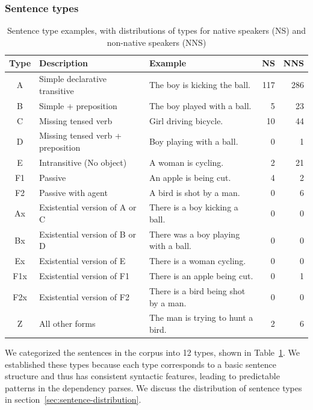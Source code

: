 \subsubsection{Sentence types}

\begin{table}[htb!]
\begin{center}
\begin{tabular}{|c|l|l|r|r|}
\hline
Type & Description & Example & NS & NNS \\
\hline
 A & Simple declarative transitive & The boy is kicking the ball. & 117 & 286 \\
 \hline
 B & Simple + preposition & The boy played with a ball. & 5 & 23 \\
 \hline
 C & Missing tensed verb & Girl driving bicycle. & 10 & 44 \\
 \hline
 D & Missing tensed verb + preposition & Boy playing with a ball. & 0 & 1 \\
 \hline
 E & Intransitive (No object) & A woman is cycling. & 2 & 21 \\
 \hline
 F1 & Passive & An apple is being cut. & 4 & 2 \\
 \hline
 F2 & Passive with agent & A bird is shot by a man. & 0 & 6 \\
 \hline
 Ax & Existential version of A or C & There is a boy kicking a ball. & 0 & 0 \\
 \hline
 Bx & Existential version of B  or D & There was a boy playing with a ball. & 0 & 0 \\
 \hline
 Ex & Existential version of E & There is a woman cycling. & 0 & 0 \\
 \hline
 F1x & Existential version of F1 & There is an apple being cut. & 0 & 1 \\
 \hline
 F2x & Existential version of F2 & There is a bird being shot by a man. & 0 & 0 \\
 \hline
 Z & All other forms & The man is trying to hunt a bird. & 2 & 6 \\
 \hline
\end{tabular}
\end{center}
\caption{Sentence type examples, with distributions of types for
  native speakers (NS) and non-native speakers (NNS)}
\label{tab:sentence-type}
\end{table}

We categorized the sentences in the corpus into 12 types, shown in
Table~\ref{tab:sentence-type}. We established these types because each
type corresponds to a basic sentence structure and thus has consistent
syntactic features, leading to predictable patterns in the dependency
parses.  We discuss the distribution of sentence types in
section~\ref{sec:sentence-distribution}.

